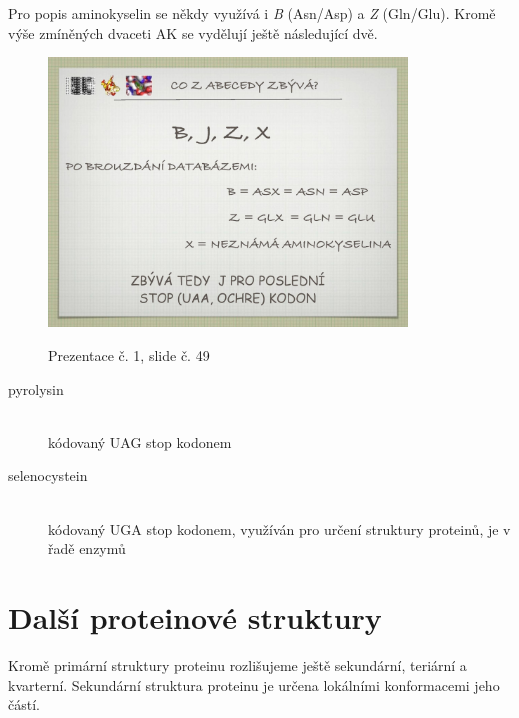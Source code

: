\documentclass[DIV=8]{scrreprt}
\begin{document}
Pro popis aminokyselin se někdy využívá i \emph{B} (Asn/Asp) a \emph{Z} (Gln/Glu). Kromě výše zmíněných dvaceti AK se vydělují ještě následující dvě.

\begin{figure}
    \caption{Prezentace č. 1, slide č. 49}
    \includegraphics[width=0.85\textwidth]{slides-1/slide-49.jpg}
    \centering
    \label{slides-1-slide-49}
\end{figure}

\begin{description}
\item[pyrolysin]\hfill \\
kódovaný UAG stop kodonem


\item[selenocystein]\hfill \\
kódovaný UGA stop kodonem, využíván pro určení struktury proteinů, je v řadě enzymů

\end{description}


\section{Další proteinové struktury} \label{Další proteinové struktury}


Kromě primární struktury proteinu rozlišujeme ještě sekundární, teriární a kvarterní. Sekundární struktura proteinu je určena lokálními konformacemi jeho částí.
\end{document}
